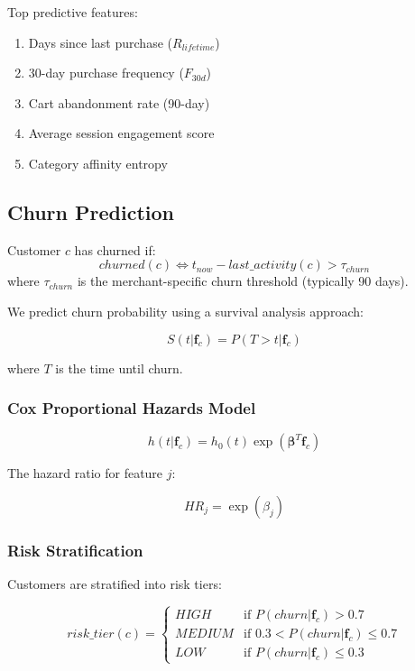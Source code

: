 Top predictive features:

\begin{enumerate}
    \item Days since last purchase ($R_{lifetime}$)
    \item 30-day purchase frequency ($F_{30d}$)
    \item Cart abandonment rate (90-day)
    \item Average session engagement score
    \item Category affinity entropy
\end{enumerate}

\subsection{Churn Prediction}

\begin{definition}
Customer $c$ has churned if:
\begin{equation}
churned(c) \iff t_{now} - last\_activity(c) > \tau_{churn}
\end{equation}
where $\tau_{churn}$ is the merchant-specific churn threshold (typically 90 days).
\end{definition}

We predict churn probability using a survival analysis approach:

\begin{equation}
S(t | \mathbf{f}_c) = P(T > t | \mathbf{f}_c)
\end{equation}

where $T$ is the time until churn.

\subsubsection{Cox Proportional Hazards Model}

\begin{equation}
h(t | \mathbf{f}_c) = h_0(t) \exp(\boldsymbol{\beta}^T \mathbf{f}_c)
\end{equation}

The hazard ratio for feature $j$:

\begin{equation}
HR_j = \exp(\beta_j)
\end{equation}

\subsubsection{Risk Stratification}

Customers are stratified into risk tiers:

\begin{equation}
risk\_tier(c) = \begin{cases}
    HIGH & \text{if } P(churn | \mathbf{f}_c) > 0.7 \\
    MEDIUM & \text{if } 0.3 < P(churn | \mathbf{f}_c) \leq 0.7 \\
    LOW & \text{if } P(churn | \mathbf{f}_c) \leq 0.3
\end{cases}
\end{equation}

